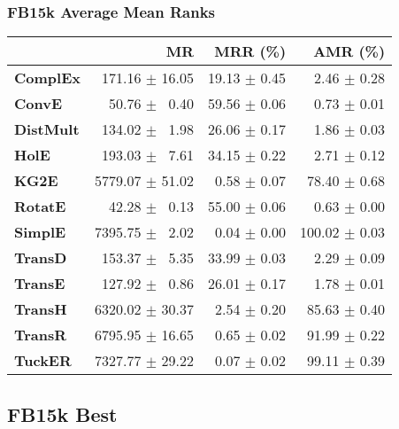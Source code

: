 \documentclass{article}
\begin{document}
\subsubsection{FB15k Average Mean Ranks}
    \begin{center}
    \begin{tabular}{lrrr}
\toprule
{} &               MR &      MRR (\%) &       AMR (\%) \\
\midrule
\textbf{ComplEx } &  $\phantom{5}$171.16 $\pm$ 16.05 &  19.13 $\pm$ 0.45 &  $\phantom{5}$$\phantom{5}$2.46 $\pm$ 0.28 \\
\textbf{ConvE   } &  $\phantom{5}$$\phantom{5}$50.76 $\pm$ $\phantom{5}$0.40 &  59.56 $\pm$ 0.06 &  $\phantom{5}$$\phantom{5}$0.73 $\pm$ 0.01 \\
\textbf{DistMult} &  $\phantom{5}$134.02 $\pm$ $\phantom{5}$1.98 &  26.06 $\pm$ 0.17 &  $\phantom{5}$$\phantom{5}$1.86 $\pm$ 0.03 \\
\textbf{HolE    } &  $\phantom{5}$193.03 $\pm$ $\phantom{5}$7.61 &  34.15 $\pm$ 0.22 &  $\phantom{5}$$\phantom{5}$2.71 $\pm$ 0.12 \\
\textbf{KG2E    } &  5779.07 $\pm$ 51.02 &  $\phantom{5}$0.58 $\pm$ 0.07 &  $\phantom{5}$78.40 $\pm$ 0.68 \\
\textbf{RotatE  } &  $\phantom{5}$$\phantom{5}$42.28 $\pm$ $\phantom{5}$0.13 &  55.00 $\pm$ 0.06 &  $\phantom{5}$$\phantom{5}$0.63 $\pm$ 0.00 \\
\textbf{SimplE  } &  7395.75 $\pm$ $\phantom{5}$2.02 &  $\phantom{5}$0.04 $\pm$ 0.00 &  100.02 $\pm$ 0.03 \\
\textbf{TransD  } &  $\phantom{5}$153.37 $\pm$ $\phantom{5}$5.35 &  33.99 $\pm$ 0.03 &  $\phantom{5}$$\phantom{5}$2.29 $\pm$ 0.09 \\
\textbf{TransE  } &  $\phantom{5}$127.92 $\pm$ $\phantom{5}$0.86 &  26.01 $\pm$ 0.17 &  $\phantom{5}$$\phantom{5}$1.78 $\pm$ 0.01 \\
\textbf{TransH  } &  6320.02 $\pm$ 30.37 &  $\phantom{5}$2.54 $\pm$ 0.20 &  $\phantom{5}$85.63 $\pm$ 0.40 \\
\textbf{TransR  } &  6795.95 $\pm$ 16.65 &  $\phantom{5}$0.65 $\pm$ 0.02 &  $\phantom{5}$91.99 $\pm$ 0.22 \\
\textbf{TuckER  } &  7327.77 $\pm$ 29.22 &  $\phantom{5}$0.07 $\pm$ 0.02 &  $\phantom{5}$99.11 $\pm$ 0.39 \\
\bottomrule
\end{tabular}

    \end{center}
\subsection{FB15k Best}
\end{document}
